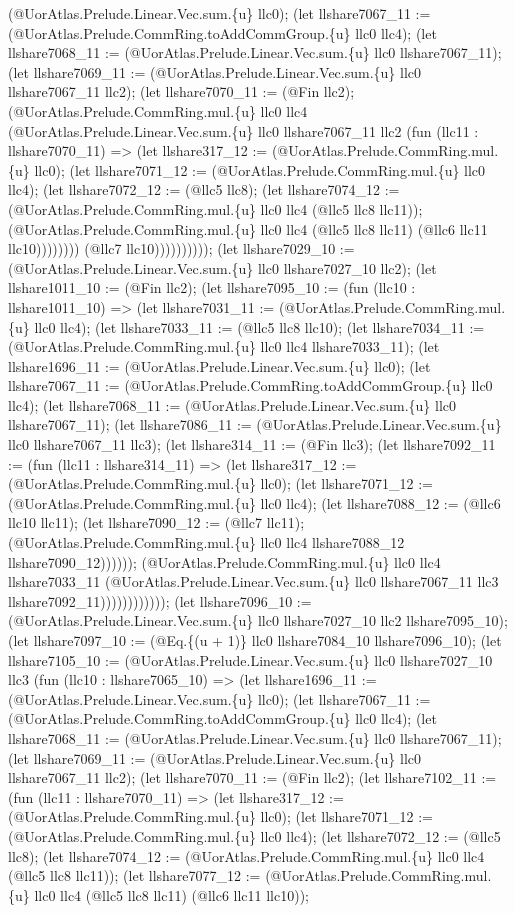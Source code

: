 \documentclass[11pt]{article}
\begin{document}
(@UorAtlas.Prelude.Linear.Vec.sum.\{u\} llc0); (let llshare7067\_11 := (@UorAtlas.Prelude.CommRing.toAddCommGroup.\{u\} llc0 llc4); (let llshare7068\_11 := (@UorAtlas.Prelude.Linear.Vec.sum.\{u\} llc0 llshare7067\_11); (let llshare7069\_11 := (@UorAtlas.Prelude.Linear.Vec.sum.\{u\} llc0 llshare7067\_11 llc2); (let llshare7070\_11 := (@Fin llc2); (@UorAtlas.Prelude.CommRing.mul.\{u\} llc0 llc4 (@UorAtlas.Prelude.Linear.Vec.sum.\{u\} llc0 llshare7067\_11 llc2 (fun (llc11 : llshare7070\_11) => (let llshare317\_12 := (@UorAtlas.Prelude.CommRing.mul.\{u\} llc0); (let llshare7071\_12 := (@UorAtlas.Prelude.CommRing.mul.\{u\} llc0 llc4); (let llshare7072\_12 := (@llc5 llc8); (let llshare7074\_12 := (@UorAtlas.Prelude.CommRing.mul.\{u\} llc0 llc4 (@llc5 llc8 llc11)); (@UorAtlas.Prelude.CommRing.mul.\{u\} llc0 llc4 (@llc5 llc8 llc11) (@llc6 llc11 llc10)))))))) (@llc7 llc10)))))))))); (let llshare7029\_10 := (@UorAtlas.Prelude.Linear.Vec.sum.\{u\} llc0 llshare7027\_10 llc2); (let llshare1011\_10 := (@Fin llc2); (let llshare7095\_10 := (fun (llc10 : llshare1011\_10) => (let llshare7031\_11 := (@UorAtlas.Prelude.CommRing.mul.\{u\} llc0 llc4); (let llshare7033\_11 := (@llc5 llc8 llc10); (let llshare7034\_11 := (@UorAtlas.Prelude.CommRing.mul.\{u\} llc0 llc4 llshare7033\_11); (let llshare1696\_11 := (@UorAtlas.Prelude.Linear.Vec.sum.\{u\} llc0); (let llshare7067\_11 := (@UorAtlas.Prelude.CommRing.toAddCommGroup.\{u\} llc0 llc4); (let llshare7068\_11 := (@UorAtlas.Prelude.Linear.Vec.sum.\{u\} llc0 llshare7067\_11); (let llshare7086\_11 := (@UorAtlas.Prelude.Linear.Vec.sum.\{u\} llc0 llshare7067\_11 llc3); (let llshare314\_11 := (@Fin llc3); (let llshare7092\_11 := (fun (llc11 : llshare314\_11) => (let llshare317\_12 := (@UorAtlas.Prelude.CommRing.mul.\{u\} llc0); (let llshare7071\_12 := (@UorAtlas.Prelude.CommRing.mul.\{u\} llc0 llc4); (let llshare7088\_12 := (@llc6 llc10 llc11); (let llshare7090\_12 := (@llc7 llc11); (@UorAtlas.Prelude.CommRing.mul.\{u\} llc0 llc4 llshare7088\_12 llshare7090\_12)))))); (@UorAtlas.Prelude.CommRing.mul.\{u\} llc0 llc4 llshare7033\_11 (@UorAtlas.Prelude.Linear.Vec.sum.\{u\} llc0 llshare7067\_11 llc3 llshare7092\_11)))))))))))); (let llshare7096\_10 := (@UorAtlas.Prelude.Linear.Vec.sum.\{u\} llc0 llshare7027\_10 llc2 llshare7095\_10); (let llshare7097\_10 := (@Eq.\{(u + 1)\} llc0 llshare7084\_10 llshare7096\_10); (let llshare7105\_10 := (@UorAtlas.Prelude.Linear.Vec.sum.\{u\} llc0 llshare7027\_10 llc3 (fun (llc10 : llshare7065\_10) => (let llshare1696\_11 := (@UorAtlas.Prelude.Linear.Vec.sum.\{u\} llc0); (let llshare7067\_11 := (@UorAtlas.Prelude.CommRing.toAddCommGroup.\{u\} llc0 llc4); (let llshare7068\_11 := (@UorAtlas.Prelude.Linear.Vec.sum.\{u\} llc0 llshare7067\_11); (let llshare7069\_11 := (@UorAtlas.Prelude.Linear.Vec.sum.\{u\} llc0 llshare7067\_11 llc2); (let llshare7070\_11 := (@Fin llc2); (let llshare7102\_11 := (fun (llc11 : llshare7070\_11) => (let llshare317\_12 := (@UorAtlas.Prelude.CommRing.mul.\{u\} llc0); (let llshare7071\_12 := (@UorAtlas.Prelude.CommRing.mul.\{u\} llc0 llc4); (let llshare7072\_12 := (@llc5 llc8); (let llshare7074\_12 := (@UorAtlas.Prelude.CommRing.mul.\{u\} llc0 llc4 (@llc5 llc8 llc11)); (let llshare7077\_12 := (@UorAtlas.Prelude.CommRing.mul.\{u\} llc0 llc4 (@llc5 llc8 llc11) (@llc6 llc11 llc10)); 
\end{document}
